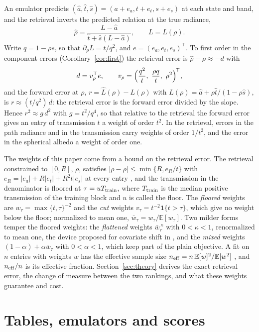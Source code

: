 \documentclass[11pt]{article}
\theoremstyle{remark}
\newcommand{\E}{\mathbb{E}}
\newcommand{\1}{\mathbf{1}}
\begin{document}
An emulator predicts $(\hat a,\hat t,\hat s)=(a+e_a,t+e_t,s+e_s)$ at each state and band, and the retrieval inverts the
predicted relation at the true radiance,
\[
\hat\rho=\frac{L-\hat a}{\hat t+\hat s(L-\hat a)},\qquad L=L(\rho).
\]
Write $q=1-\rho s$, so that $\partial_\rho L=t/q^2$, and $e=(e_a,e_t,e_s)^\top$. To first order in the component errors
(Corollary~\ref{cor:first}) the retrieval error is $\hat\rho-\rho\approx-d$ with
\[
d=v_\rho^\top e,\qquad v_\rho=\Bigl(\frac{q^2}{t},\ \frac{\rho q}{t},\ \rho^2\Bigr)^{\!\top},
\]
and the forward error at $\rho$, $r=\hat L(\rho)-L(\rho)$ with $\hat L(\rho)=\hat a+\rho\hat t/(1-\rho\hat s)$, is
$r\approx(t/q^2)\,d$: the retrieval error is the forward error divided by the slope. Hence $r^2\approx g\,d^2$ with
$g=t^2/q^4$, so that relative to the retrieval the forward error gives an entry of transmission $t$ a weight of order
$t^2$. In the retrieval, errors in the path radiance and in the transmission carry weights of order $1/t^2$, and the error
in the spherical albedo a weight of order one.

The weights of this paper come from a bound on the retrieval error. The retrieval constrained to $[0,R]$, $\bar\rho$,
satisfies $|\bar\rho-\rho|\le\min\{R,e_R/t\}$ with $e_R=|e_a|+R|e_t|+R^2t|e_s|$ at every entry \cite{shmalo2}, and the
transmission in the denominator is floored at $\tau=uT_{\rm train}$, where $T_{\rm train}$ is the median positive
transmission of the training block and $u$ is called the floor. The \emph{floored} weights are $w_\tau=\max\{t,\tau\}^{-2}$
and the \emph{cut} weights $v_\tau=t^{-2}\1\{t>\tau\}$, which give no weight below the floor; normalized to mean one,
$\bar w_\tau=w_\tau/\E[w_\tau]$. Two milder forms temper the floored weights: the \emph{flattened} weights
$\bar w_\tau^{\,\kappa}$ with $0<\kappa<1$, renormalized to mean one, the device proposed for covariate shift in
\cite{shimodaira}, and the \emph{mixed} weights $(1-\alpha)+\alpha\bar w_\tau$ with $0<\alpha<1$, which keep part of the
plain objective. A fit on $n$ entries with weights $w$ has the effective sample size $n_{\rm eff}=n\,\E[w]^2/\E[w^2]$
\cite{kish}, and $n_{\rm eff}/n$ is its effective fraction. Section~\ref{sec:theory} derives the exact retrieval error,
the change of measure between the two rankings, and what these weights guarantee and cost.

\section{Tables, emulators and scores}\label{sec:data}
\end{document}
